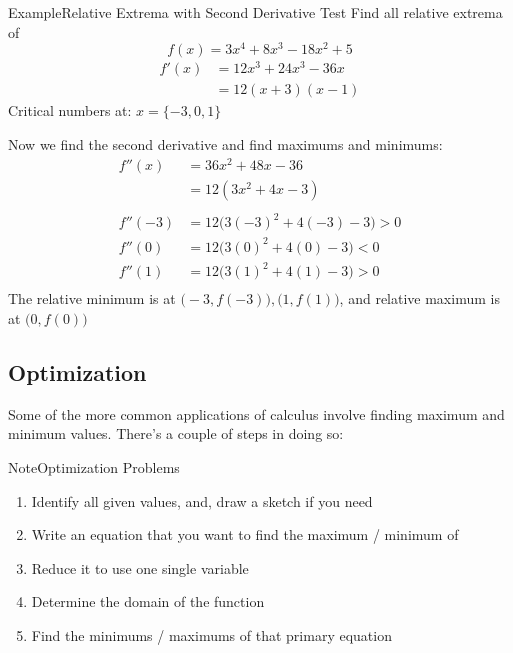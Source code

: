 \documentclass{MathNotes}
\newenvironment{example}[1]{\begin{BlueBox}{Example}{#1}}{\end{BlueBox}}
\newenvironment{note}[1]{\begin{YellowBox}{Note}{#1}}{\end{YellowBox}}
\begin{document}
\newpage
{}
\begin{example}{Relative Extrema with Second Derivative Test}
	Find all relative extrema of $$f(x)=3x^4+8x^3-18x^2+5$$
	\begin{align*}
		f'(x) & =12x^3+24x^3-36x \\
		      & =12(x+3)(x-1)
	\end{align*}
	Critical numbers at: $x=\{-3, 0, 1\}$

	Now we find the second derivative and find maximums and minimums:
	\begin{align*}
		f''(x)  & =36x^2+48x-36                  \\
		        & =12(3x^2+4x-3)                 \\
		\\
		f''(-3) & =12\big(3(-3)^2+4(-3)-3\big)>0 \\
		f''(0)  & =12\big(3(0)^2+4(0)-3\big)<0   \\
		f''(1)  & =12\big(3(1)^2+4(1)-3\big)>0   \\
	\end{align*}
	The relative minimum is at $\big(-3, f(-3)\big), \big(1, f(1)\big)$,
	and relative maximum is at $\big(0, f(0)\big)$
\end{example}

\subsection{Optimization}\label{sec:optimization}
Some of the more common applications of calculus involve finding maximum and
minimum values. There's a couple of steps in doing so:
\begin{note}{Optimization Problems}\label{note:optimization-guide}
	\begin{enumerate}
		\item Identify all given values, and, draw a sketch if you need
		\item Write an equation that you want to find the maximum / minimum of
		\item Reduce it to use one single variable
		\item Determine the domain of the function
		\item Find the minimums / maximums of that primary equation
	\end{enumerate}
\end{note}
\end{document}
